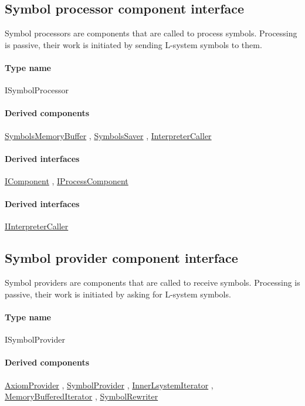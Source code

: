 \subsection{Symbol processor component interface}
\label{Malsys.Processing.Components.ISymbolProcessor}
Symbol processors are components that are called to process symbols.
            Processing is passive, their work is initiated by sending L-system symbols to them.\paragraph{Type name}
ISymbolProcessor	\paragraph{Derived components}
		\hyperref[Malsys.Processing.Components.Common.SymbolsMemoryBuffer]{SymbolsMemoryBuffer}%
, 		\hyperref[Malsys.Processing.Components.Common.SymbolsSaver]{SymbolsSaver}%
, 		\hyperref[Malsys.Processing.Components.Interpreters.InterpreterCaller]{InterpreterCaller}%
	\paragraph{Derived interfaces}
		\hyperref[Malsys.Processing.Components.IComponent]{IComponent}%
, 		\hyperref[Malsys.Processing.Components.IProcessComponent]{IProcessComponent}%
	\paragraph{Derived interfaces}
		\hyperref[Malsys.Processing.Components.IInterpreterCaller]{IInterpreterCaller}%
	

\subsection{Symbol provider component interface}
\label{Malsys.Processing.Components.ISymbolProvider}
Symbol providers are components that are called to receive symbols.
            Processing is passive, their work is initiated by asking for L-system symbols.\paragraph{Type name}
ISymbolProvider	\paragraph{Derived components}
		\hyperref[Malsys.Processing.Components.Common.AxiomProvider]{AxiomProvider}%
, 		\hyperref[Malsys.Processing.Components.Common.SymbolProvider]{SymbolProvider}%
, 		\hyperref[Malsys.Processing.Components.RewriterIterators.InnerLsystemIterator]{InnerLsystemIterator}%
, 		\hyperref[Malsys.Processing.Components.RewriterIterators.MemoryBufferedIterator]{MemoryBufferedIterator}%
, 		\hyperref[Malsys.Processing.Components.Rewriters.SymbolRewriter]{SymbolRewriter}%
